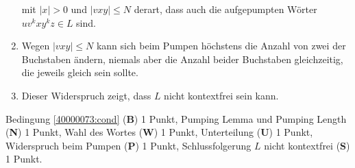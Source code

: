 \begin{loesung}
\begin{enumerate}
\begin{center}
\end{center}
mit $|x|>0$ und $|vxy|\le N$ derart,
dass auch die aufgepumpten Wörter $uv^kxy^kz\in L$ sind.
\item
Wegen $|vxy|\le N$ kann sich beim Pumpen höchstens die Anzahl von
zwei der Buchstaben ändern, niemals aber die Anzahl beider Buchstaben
gleichzeitig, die jeweils gleich sein sollte.
\item
Dieser Widerspruch zeigt, dass $L$ nicht kontextfrei sein kann.
\qedhere
\end{enumerate}
\end{loesung}

\begin{bewertung}
Bedingung \eqref{40000073:cond} ({\bf B}) 1 Punkt,
Pumping Lemma und Pumping Length ({\bf N}) 1 Punkt,
Wahl des Wortes ({\bf W}) 1 Punkt,
Unterteilung ({\bf U}) 1 Punkt,
Widerspruch beim Pumpen ({\bf P}) 1 Punkt,
Schlussfolgerung $L$ nicht kontextfrei ({\bf S}) 1 Punkt.
\end{bewertung}
